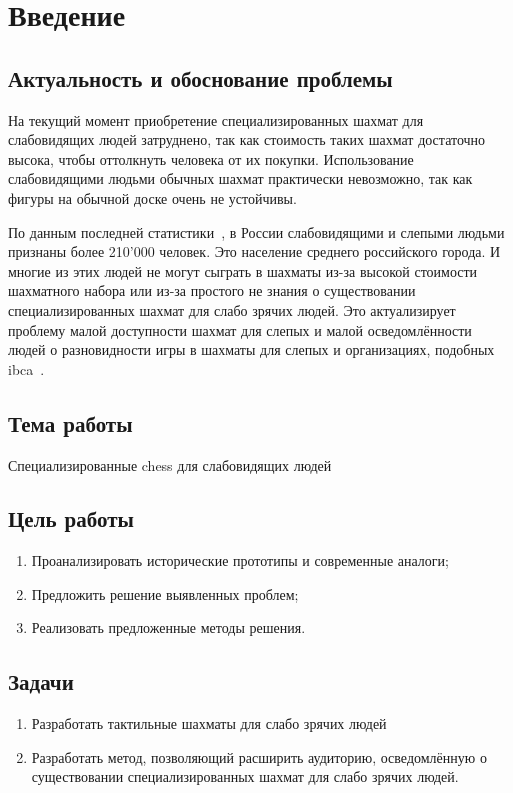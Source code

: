 \section{Введение}
\subsection{Актуальность и обоснование проблемы}
На текущий момент приобретение специализированных шахмат для слабовидящих людей
затруднено, так как стоимость таких шахмат достаточно высока, чтобы оттолкнуть
человека от их покупки. Использование слабовидящими людьми обычных шахмат
практически невозможно, так как фигуры на обычной доске очень не устойчивы. 

По данным последней статистики~\cite{web:min-educ}, в России слабовидящими и
слепыми людьми признаны более 210'000 человек. Это население среднего
российского города. И многие из этих людей не могут сыграть в шахматы из-за
высокой стоимости шахматного набора или из-за простого не знания о существовании
специализированных шахмат для слабо зрячих людей. Это актуализирует проблему
малой доступности шахмат для слепых и малой осведомлённости людей о разновидности игры в
шахматы для слепых и организациях, подобных \acrshort{ibca}~\cite{web:wiki-ibca}.\@

\subsection{Тема работы}
Специализированные \gls{chess} для слабовидящих людей

\subsection{Цель работы}
\begin{enumerate}
    \item Проанализировать исторические прототипы и современные аналоги;
    \item Предложить решение выявленных проблем;
    \item Реализовать предложенные методы решения.
\end{enumerate}

\subsection{Задачи}
\begin{enumerate}
    \item Разработать тактильные шахматы для слабо зрячих людей
    \item Разработать метод, позволяющий расширить аудиторию, осведомлённую о
        существовании специализированных шахмат для слабо зрячих людей.
\end{enumerate}
\newpage
